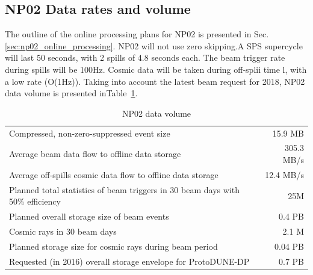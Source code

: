 \documentclass[12pt]{article}
\begin{document}
\subsection{NP02 Data rates and  volume}
\label{sec:np02_data_rate}
The outline of the online processing plans for NP02 is presented in Sec.\,\ref{sec:np02_online_processing}.
NP02 will not use zero skipping.A SPS supercycle will last 50 seconds, with 2 spills of 4.8 seconds each.
The beam trigger rate during spills will be 100Hz. Cosmic data will be taken during off-splii time l, with a low rate (O(1Hz)).
Taking into account the  latest beam request for 2018,  NP02 data volume  is   presented  inTable~\ref{tab:np02_data_rate}.

\begin{table}[htbp]
  \centering
  \begin{tabular}[h]{l|r}
\hline
     Compressed, non-zero-suppressed event size & 15.9 MB\\
    Average beam data flow to offline data storage &   305.3 MB/s  \\
    Average off-spills cosmic data flow to offline data storage &   12.4 MB/s\\
    Planned total statistics of beam triggers in 30 beam days with 50\% efficiency&25M\\
    Planned overall storage size of beam events&   0.4 PB\\
   Cosmic rays in 30  beam days&  2.1  M\\
   Planned storage size for cosmic rays during beam period&  0.04 PB\\
   Requested (in 2016) overall storage envelope for ProtoDUNE-DP&0.7 PB \\
    \hline
  \end{tabular}
 \caption{NP02 data volume}
  \label{tab:np02_data_rate}
\end{table}
\end{document}
